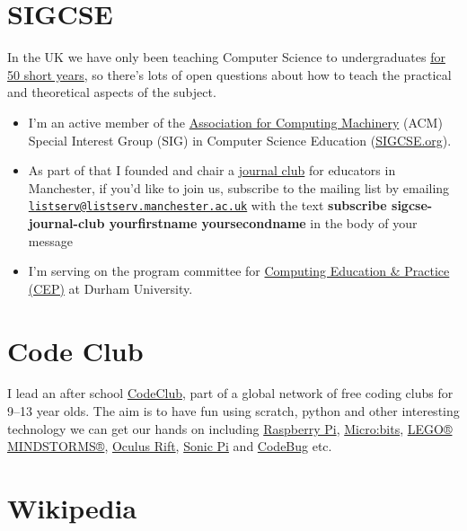 \documentclass[12pt,]{book}
\providecommand{\tightlist}{%
  \setlength{\itemsep}{0pt}\setlength{\parskip}{0pt}}
\begin{document}
\hypertarget{sigcse}{%
\section{SIGCSE}\label{sigcse}}

In the UK we have only been teaching Computer Science to undergraduates \href{http://www.bbc.co.uk/manchester/content/articles/2005/11/07/baby_computer_40_interview_feature.shtml}{for 50 short years}, so there's lots of open questions about how to teach the practical and theoretical aspects of the subject.

\begin{itemize}
\tightlist
\item
  I'm an active member of the \href{https://en.wikipedia.org/wiki/Association_for_Computing_Machinery}{Association for Computing Machinery} (ACM) Special Interest Group (SIG) in Computer Science Education (\href{https://sigcse.org}{SIGCSE.org}).
\item
  As part of that I founded and chair a \href{https://duncan.hull.name/2019/07/17/sigcse-journal-club/}{journal club} for educators in Manchester, if you'd like to join us, subscribe to the mailing list by emailing \href{mailto:listserv@listserv.manchester.ac.uk}{\nolinkurl{listserv@listserv.manchester.ac.uk}} with the text \textbf{subscribe sigcse-journal-club yourfirstname yoursecondname} in the body of your message
\item
  I'm serving on the program committee for \href{http://community.dur.ac.uk/cep.conference}{Computing Education \& Practice (CEP)} at Durham University.
\end{itemize}

\hypertarget{code-club}{%
\section{Code Club}\label{code-club}}

I lead an after school \href{https://codeclub.org}{CodeClub}, part of a global network of free coding clubs for 9--13 year olds. The aim is to have fun using scratch, python and other interesting technology we can get our hands on including \href{https://www.raspberrypi.org/}{Raspberry Pi}, \href{https://microbit.org/}{Micro:bits}, \href{https://www.lego.com/en-gb/themes/mindstorms}{LEGO® MINDSTORMS®}, \href{https://www.oculus.com}{Oculus Rift}, \href{https://sonic-pi.net/}{Sonic Pi} and \href{http://www.codebug.org.uk/}{CodeBug} etc.

\hypertarget{wikipedia}{%
\section{Wikipedia}\label{wikipedia}}
\end{document}
